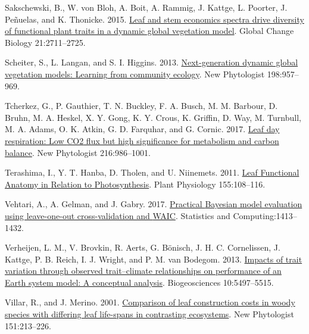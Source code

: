 \documentclass[
  12pt,
  letterpaper,
  DIV=11,
  numbers=noendperiod]{scrartcl}
\newlength{\cslhangindent}
\newlength{\cslentryspacingunit} %
\newenvironment{CSLReferences}[2] %
 {%
  \setlength{\parindent}{0pt}
  \ifodd #1
  \let\oldpar\par
  \def\par{\hangindent=\cslhangindent\oldpar}
  \fi
  \setlength{\parskip}{#2\cslentryspacingunit}
 }%
 {}
\begin{document}
\begin{CSLReferences}{1}{0}
\leavevmode{}%
Sakschewski, B., W. von Bloh, A. Boit, A. Rammig, J. Kattge, L. Poorter,
J. Peñuelas, and K. Thonicke. 2015.
\href{https://doi.org/10.1111/gcb.12870}{Leaf and stem economics spectra
drive diversity of functional plant traits in a dynamic global
vegetation model}. Global Change Biology 21:2711--2725.

\leavevmode{}%
Scheiter, S., L. Langan, and S. I. Higgins. 2013.
\href{https://doi.org/10.1111/nph.12210}{Next-generation dynamic global
vegetation models: {Learning} from community ecology}. New Phytologist
198:957--969.

\leavevmode{}%
Tcherkez, G., P. Gauthier, T. N. Buckley, F. A. Busch, M. M. Barbour, D.
Bruhn, M. A. Heskel, X. Y. Gong, K. Y. Crous, K. Griffin, D. Way, M.
Turnbull, M. A. Adams, O. K. Atkin, G. D. Farquhar, and G. Cornic. 2017.
\href{https://doi.org/10.1111/nph.14816}{Leaf day respiration: Low {CO2}
flux but high significance for metabolism and carbon balance}. New
Phytologist 216:986--1001.

\leavevmode{}%
Terashima, I., Y. T. Hanba, D. Tholen, and U. Niinemets. 2011.
\href{https://doi.org/10.1104/pp.110.165472}{Leaf {Functional Anatomy}
in {Relation} to {Photosynthesis}}. Plant Physiology 155:108--116.

\leavevmode{}%
Vehtari, A., A. Gelman, and J. Gabry. 2017.
\href{https://doi.org/10.1007/s11222-016-9696-4}{Practical {Bayesian}
model evaluation using leave-one-out cross-validation and {WAIC}}.
Statistics and Computing:1413--1432.

\leavevmode{}%
Verheijen, L. M., V. Brovkin, R. Aerts, G. Bönisch, J. H. C.
Cornelissen, J. Kattge, P. B. Reich, I. J. Wright, and P. M. van
Bodegom. 2013. \href{https://doi.org/10.5194/bg-10-5497-2013}{Impacts of
trait variation through observed trait--climate relationships on
performance of an {Earth} system model: A conceptual analysis}.
Biogeosciences 10:5497--5515.

\leavevmode{}%
Villar, R., and J. Merino. 2001.
\href{https://doi.org/10.1046/j.1469-8137.2001.00147.x}{Comparison of
leaf construction costs in woody species with differing leaf life-spans
in contrasting ecosystems}. New Phytologist 151:213--226.


\end{CSLReferences}
\end{document}
